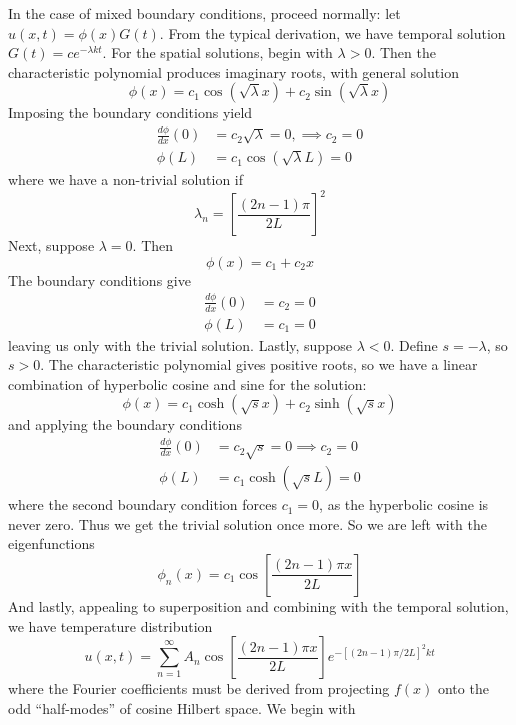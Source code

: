 \documentclass[a4paper]{article}
\begin{document}
In the case of mixed boundary conditions, proceed normally: let \( u \!\left( x,t \right) = \phi \!\left( x \right)G \!\left( t \right) \). From the typical derivation, we have temporal solution \( G \!\left( t \right) = ce^{-\lambda kt} \). For the spatial solutions, begin with \( \lambda > 0 \). Then the characteristic polynomial produces imaginary roots, with general solution
\[
	\phi \!\left( x \right) = c_{1}\cos\!\left(\sqrt{\lambda}x\right) + c_{2}\sin\!\left(\sqrt{\lambda}x\right) 
\]
Imposing the boundary conditions yield
\begin{align*}
	\frac{d \phi}{d x}\!\left( 0 \right) & = c_{2}\sqrt{\lambda} = 0, \implies c_{2} = 0 \\
	\phi \!\left( L \right) & = c_{1}\cos\!\left(\sqrt{\lambda}L\right) = 0
\end{align*}
where we have a non-trivial solution if 
\[
	\lambda_{n} = \!\left[ \frac{\!\left( 2n - 1 \right)\pi}{2L} \right]^{2}
\]
Next, suppose \( \lambda = 0 \). Then
\[
	\phi \!\left( x \right) = c_{1} + c_{2}x 
\]
The boundary conditions give 
\begin{align*}
	\frac{d \phi}{d x}\!\left( 0 \right) & = c_{2} = 0 \\
	\phi \!\left( L \right) & = c_{1} = 0
\end{align*}
leaving us only with the trivial solution. Lastly, suppose \( \lambda < 0 \). Define \( s = -\lambda \), so \( s > 0 \). The characteristic polynomial gives positive roots, so we have a linear combination of hyperbolic cosine and sine for the solution:
\[
	\phi \!\left( x \right) = c_{1}\cosh\!\left(\sqrt{s}x\right) + c_{2}\sinh\!\left(\sqrt{s}x\right) 
\]
and applying the boundary conditions
\begin{align*}
	\frac{d \phi}{d x}\!\left( 0 \right) & = c_{2}\sqrt{s} = 0 \implies c_{2} = 0 \\
	\phi \!\left( L \right) & = c_{1}\cosh\!\left(\sqrt{s}L\right) = 0
\end{align*}
where the second boundary condition forces \( c_{1} = 0 \), as the hyperbolic cosine is never zero. Thus we get the trivial solution once more. So we are left with the eigenfunctions
\[
	\phi_{n}\!\left( x \right) = c_{1}\cos\!\left[\frac{\!\left( 2n - 1 \right)\pi x}{2L}\right] 
\]
And lastly, appealing to superposition and combining with the temporal solution, we have temperature distribution
\[
	u \!\left( x,t \right) = \sum^{\infty}_{n=1} A_{n}\cos\!\left[\frac{\!\left( 2n - 1 \right)\pi x}{2L}\right]e^{-\!\left[ \!\left( 2n - 1 \right)\pi / 2L \right]^{2}kt}
\]
where the Fourier coefficients must be derived from projecting \( f \!\left( x \right) \) onto the odd ``half-modes'' of cosine Hilbert space. We begin with
\end{document}
